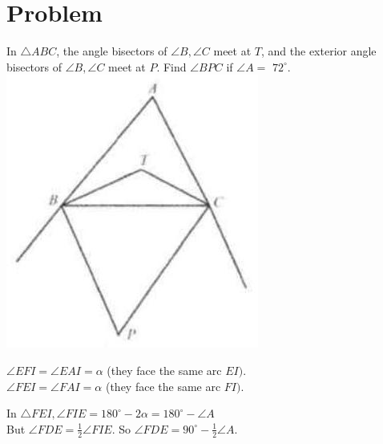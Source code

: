 \documentclass{article}
\begin{document}
\section*{Problem}
In \(\triangle A B C\), the angle bisectors of \(\angle B, \angle C\) meet at \(T\), and the exterior angle bisectors of \(\angle B, \angle C\) meet at \(P\). Find \(\angle B P C\) if \(\angle A=\) \(72^{\circ}\).\\
\centering
\includegraphics[width=\textwidth]{images/208(1).jpg}


\(\angle E F I=\angle E A I=\alpha\) (they face the same arc \(E I)\).\\
\(\angle F E I=\angle F A I=\alpha\) (they face the same arc \(F I)\).

In \(\triangle F E I, \angle F I E=180^{\circ}-2 \alpha=180^{\circ}-\angle A\)\\
But \(\angle F D E=\frac{1}{2} \angle F I E\). So \(\angle F D E=90^{\circ}-\frac{1}{2} \angle A\).
\end{document}
